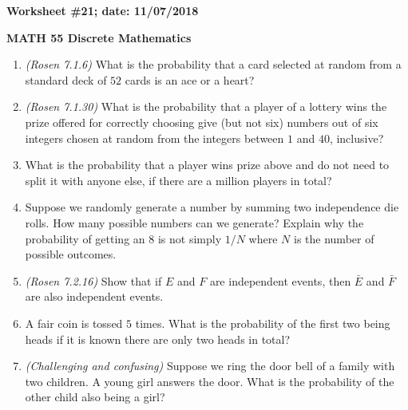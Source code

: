 \documentclass{article}
\begin{document}
{\bf Worksheet \#21; date: 11/07/2018}

{\bf MATH 55 Discrete Mathematics}

\begin{enumerate}
\item {\em (Rosen 7.1.6)} What is the probability that a card selected at random from a standard deck of $52$ cards is an ace or a heart?

\item {\em (Rosen 7.1.30)} What is the probability that a player of a lottery wins the prize offered for correctly choosing give (but not six) numbers out of six integers chosen at random from the integers between $1$ and $40$, inclusive?

\item What is the probability that a player wins prize above and do not need to split it with anyone else, if there are a million players in total?

\item Suppose we randomly generate a number by summing two independence die rolls. How many possible numbers can we generate? Explain why the probability of getting an $8$ is not simply $1 / N$ where $N$ is the number of possible outcomes.

\item {\em (Rosen 7.2.16)} Show that if $E$ and $F$ are independent events, then $\bar{E}$ and $\bar{F}$ are also independent events.

\item A fair coin is tossed $5$ times. What is the probability of the first two being heads if it is known there are only two heads in total?

\item {\em (Challenging and confusing)} Suppose we ring the door bell of a family with two children. A young girl answers the door. What is the probability of the other child also being a girl?
\end{enumerate}
\end{document}
